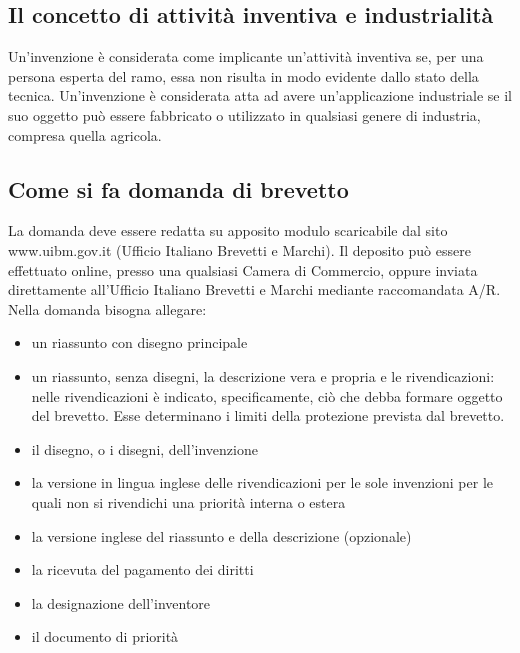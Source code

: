 \subsection{Il concetto di attività inventiva e industrialità}
Un'invenzione è considerata come implicante un'attività inventiva se, per una persona esperta del ramo, essa non risulta in modo evidente
dallo stato della tecnica.\newline
Un'invenzione è considerata atta ad avere un'applicazione industriale se il suo oggetto può essere fabbricato o utilizzato in qualsiasi genere di
industria, compresa quella agricola.

\subsection{Come si fa domanda di brevetto}
La domanda deve essere redatta su apposito modulo scaricabile dal sito www.uibm.gov.it (Ufficio Italiano Brevetti e Marchi). Il deposito può essere effettuato online, presso una
qualsiasi Camera di Commercio, oppure inviata direttamente all'Ufficio Italiano Brevetti e Marchi mediante raccomandata A/R.\newline
Nella domanda bisogna allegare:
\begin{itemize}
    \item un riassunto con disegno principale
    \item un riassunto, senza disegni, la descrizione vera e propria e le rivendicazioni: \newline
    nelle rivendicazioni è indicato, specificamente, ciò che debba formare oggetto del brevetto. Esse determinano i limiti
    della protezione prevista dal brevetto.
    \item il disegno, o i disegni, dell'invenzione
    \item la versione in lingua inglese delle rivendicazioni per le sole invenzioni per le quali non si
    rivendichi una priorità interna o estera
    \item la versione inglese del riassunto e della descrizione (opzionale)
    \item la ricevuta del pagamento dei diritti
    \item la designazione dell'inventore
    \item il documento di priorità
\end{itemize}

